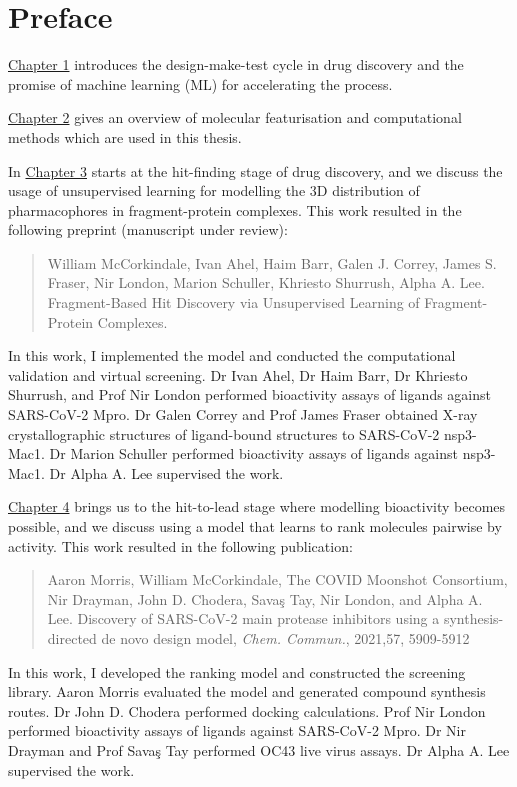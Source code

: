 \chapter*{Preface}
\hyperref[ch:intro]{Chapter 1} introduces the design-make-test cycle in drug discovery and the promise of machine learning (ML) for accelerating the process.

\hyperref[ch:background]{Chapter 2} gives an overview of molecular featurisation and computational methods which are used in this thesis.

In \hyperref[ch:fresco]{Chapter 3} starts at the hit-finding stage of drug discovery, and we discuss the usage of unsupervised learning for modelling the 3D distribution of pharmacophores in fragment-protein complexes. This work resulted in the following preprint (manuscript under review):
\begin{quote}
William McCorkindale, Ivan Ahel, Haim Barr, Galen J. Correy, James S. Fraser, Nir London, Marion Schuller, Khriesto Shurrush, Alpha A. Lee. Fragment-Based Hit Discovery via Unsupervised Learning of Fragment-Protein Complexes.
\end{quote}
In this work, I implemented the model and conducted the computational validation and virtual screening. Dr Ivan Ahel, Dr Haim Barr, Dr Khriesto Shurrush, and Prof Nir London performed bioactivity assays of ligands against SARS-CoV-2 Mpro. Dr Galen Correy and Prof James Fraser obtained X-ray crystallographic structures of ligand-bound structures to SARS-CoV-2 nsp3-Mac1. Dr Marion Schuller performed bioactivity assays of ligands against nsp3-Mac1. Dr Alpha A. Lee supervised the work.

\hyperref[ch:ranking]{Chapter 4} brings us to the hit-to-lead stage where modelling bioactivity becomes possible, and we discuss using a model that learns to rank molecules pairwise by activity. This work resulted in the following publication:
\begin{quote}
Aaron Morris, William McCorkindale, The COVID Moonshot Consortium, Nir Drayman, John D. Chodera, Savaş Tay, Nir London, and Alpha A. Lee. Discovery of SARS-CoV-2 main protease inhibitors using a synthesis-directed de novo design model, \textit{Chem. Commun.}, 2021,57, 5909-5912 
\end{quote}
In this work, I developed the ranking model and constructed the screening library. Aaron Morris evaluated the model and generated compound synthesis routes. Dr John D. Chodera performed docking calculations. Prof Nir London performed bioactivity assays of ligands against SARS-CoV-2 Mpro. Dr Nir Drayman and Prof Savaş Tay performed OC43 live virus assays. Dr Alpha A. Lee supervised the work.

